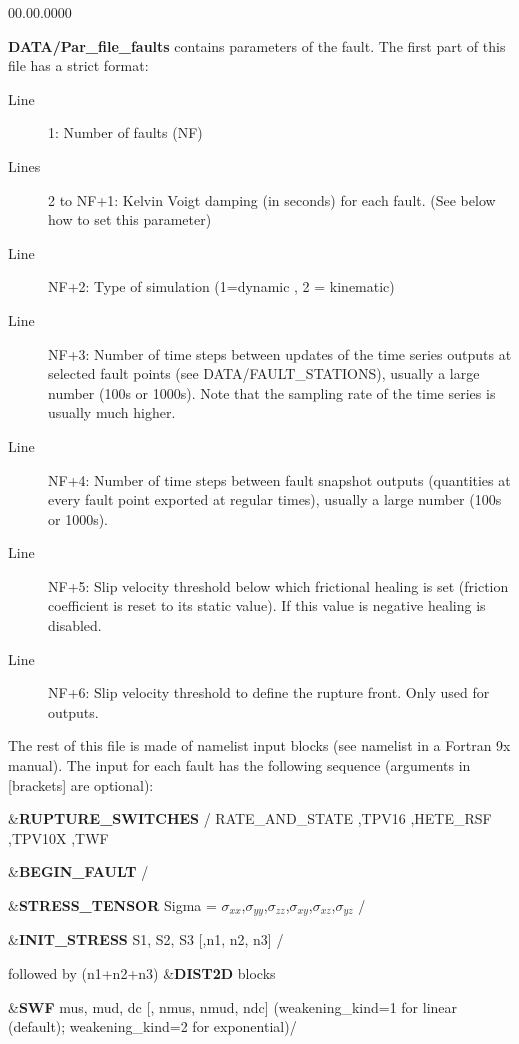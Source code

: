 \begin{lyxlist}{00.00.0000}
\item [{\textbf{DATA/Par\_file\_faults}}] contains parameters of the fault.
The first part of this file has a strict format:

\begin{description}
\item [{Line}] 1: Number of faults (NF)
\item [{Lines}] 2 to NF+1: Kelvin Voigt damping (in seconds) for each fault.
(See below how to set this parameter)
\item [{Line}] NF+2: Type of simulation (1=dynamic , 2 = kinematic)
\item [{Line}] NF+3: Number of time steps between updates of the time series
outputs at selected fault points (see DATA/FAULT\_STATIONS), usually
a large number (100s or 1000s). Note that the sampling rate of the
time series is usually much higher.
\item [{Line}] NF+4: Number of time steps between fault snapshot outputs
(quantities at every fault point exported at regular times), usually
a large number (100s or 1000s).
\item [{Line}] NF+5: Slip velocity threshold below which frictional healing
is set (friction coefficient is reset to its static value). If this
value is negative healing is disabled.
\item [{Line}] NF+6: Slip velocity threshold to define the rupture front.
Only used for outputs.
\end{description}

The rest of this file is made of namelist input blocks (see \textquotedbl{}namelist\textquotedbl{}
in a Fortran 9x manual). The input for each fault has the following
sequence (arguments in {[}brackets{]} are optional):

\&\textbf{RUPTURE\_SWITCHES}  /
RATE\_AND\_STATE ,TPV16 ,HETE\_RSF ,TPV10X ,TWF

\&\textbf{BEGIN\_FAULT} /

\&\textbf{STRESS\_TENSOR} Sigma = $\sigma_{xx}$,$\sigma_{yy}$,$\sigma_{zz}$,$\sigma_{xy}$,$\sigma_{xz}$,$\sigma_{yz}$ /



\&\textbf{INIT\_STRESS} S1, S2, S3 {[},n1, n2, n3{]} /


followed by (n1+n2+n3) \&\textbf{DIST2D} blocks


\&\textbf{SWF} mus, mud, dc {[}, nmus, nmud, ndc{]} (weakening_kind=1 for linear (default); weakening_kind=2 for exponential)/


\end{lyxlist}

